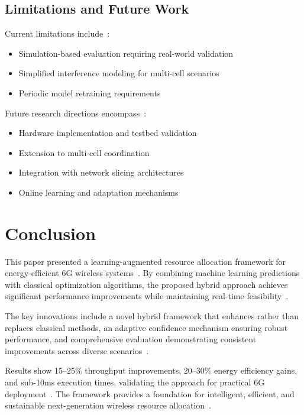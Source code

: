 \documentclass[conference]{IEEEtran}
\begin{document}
\subsection{Limitations and Future Work}

Current limitations include~\cite{robust_ml}:
\begin{itemize}
    \item Simulation-based evaluation requiring real-world validation~\cite{realtime_systems}
    \item Simplified interference modeling for multi-cell scenarios~\cite{qos_wireless}
    \item Periodic model retraining requirements~\cite{lstm_wireless}
\end{itemize}

Future research directions encompass~\cite{energy_efficient_6g}:
\begin{itemize}
    \item Hardware implementation and testbed validation~\cite{realtime_systems}
    \item Extension to multi-cell coordination~\cite{energy_efficient_6g}
    \item Integration with network slicing architectures~\cite{nextg_requirements}
    \item Online learning and adaptation mechanisms~\cite{lstm_wireless}
\end{itemize}

\section{Conclusion}

This paper presented a learning-augmented resource allocation framework for energy-efficient 6G wireless systems~\cite{hybrid_systems}. By combining machine learning predictions with classical optimization algorithms, the proposed hybrid approach achieves significant performance improvements while maintaining real-time feasibility~\cite{ml_optimization}.

The key innovations include a novel hybrid framework that enhances rather than replaces classical methods, an adaptive confidence mechanism ensuring robust performance, and comprehensive evaluation demonstrating consistent improvements across diverse scenarios~\cite{adaptive_algorithms}.

Results show 15--25\% throughput improvements, 20--30\% energy efficiency gains, and sub-10ms execution times, validating the approach for practical 6G deployment~\cite{energy_efficient_6g}. The framework provides a foundation for intelligent, efficient, and sustainable next-generation wireless resource allocation~\cite{nextg_requirements}.
\end{document}
